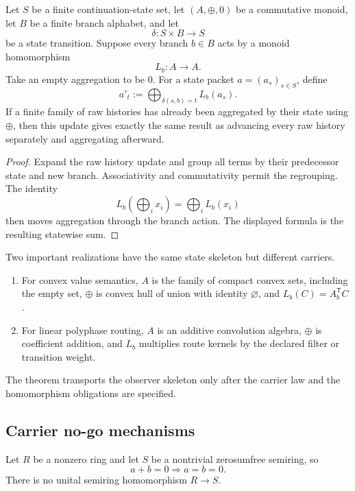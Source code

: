\begin{theorem}
\label{thm:block18-carrier-indexed-observer}
Let \(S\) be a finite continuation-state set, let \((A,\oplus,0)\) be a commutative monoid, let \(B\) be a finite branch alphabet, and let
\[
 \delta:S\times B\longrightarrow S
\]
be a state transition.  Suppose every branch \(b\in B\) acts by a monoid homomorphism
\[
 L_b:A\longrightarrow A.
\]
Take an empty aggregation to be \(0\).  For a state packet \(a=(a_s)_{s\in S}\), define
\[
 a'_t
 :=
 \bigoplus_{\delta(s,b)=t}L_b(a_s).
\]
If a finite family of raw histories has already been aggregated by their state using \(\oplus\), then this update gives exactly the same result as advancing every raw history separately and aggregating afterward.
\end{theorem}

\begin{proof}
Expand the raw history update and group all terms by their predecessor state and new branch.  Associativity and commutativity permit the regrouping.  The identity
\[
 L_b\!\left(\bigoplus_i x_i\right)
 =
 \bigoplus_i L_b(x_i)
\]
then moves aggregation through the branch action.  The displayed formula is the resulting statewise sum.
\end{proof}

Two important realizations have the same state skeleton but different carriers.
\begin{enumerate}
\item For convex value semantics, \(A\) is the family of compact convex sets, including the empty set, \(\oplus\) is convex hull of union with identity \(\varnothing\), and \(L_b(C)=A_b^{\mathsf T}C\).
\item For linear polyphase routing, \(A\) is an additive convolution algebra, \(\oplus\) is coefficient addition, and \(L_b\) multiplies route kernels by the declared filter or transition weight.
\end{enumerate}
The theorem transports the observer skeleton only after the carrier law and the homomorphism obligations are specified.

\subsection{Carrier no-go mechanisms}
\label{subsec:block18-carrier-no-go}

\begin{theorem}
\label{thm:block18-cancellation-barrier}
Let \(R\) be a nonzero ring and let \(S\) be a nontrivial zerosumfree semiring, so
\[
 a+b=0\Longrightarrow a=b=0.
\]
There is no unital semiring homomorphism \(R\to S\).
\end{theorem}

